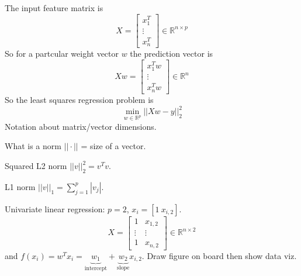 \documentclass{article}
\begin{document}
The input feature matrix is 
\begin{equation}
  X = \left[\begin{array}{c}
              x_1^T \\
              \vdots \\
              x_n^T
\end{array}\right]\in\mathbb R^{n\times p}
\end{equation}
So for a partcular weight vector $w$ the prediction vector is
\begin{equation}
  Xw = \left[\begin{array}{c}
              x_1^T w \\
              \vdots \\
              x_n^T w
\end{array}\right]\in\mathbb R^{n}
\end{equation}
So the least squares regression problem is
\begin{equation}
  \min_{w\in\mathbb R^p} || Xw - y||_2^2
\end{equation}
Notation about matrix/vector dimensions.

What is a norm $||\cdot||$ = size of a vector.

Squared L2 norm $||v||_2^2 = v^T v$.

L1 norm $||v||_1 = \sum_{j=1}^p |v_j|$.

Univariate linear regression: $p=2$, $x_i=[1\ x_{i,2}]$.
\begin{equation}
  X = \left[\begin{array}{cc}
              1 & x_{1,2} \\
              \vdots & \vdots \\
              1 & x_{n,2}
\end{array}\right]\in\mathbb R^{n\times 2}
\end{equation}
and
$f(x_i) = w^T x_i = \underbrace{w_1}_{\text{intercept}} +
\underbrace{w_2}_{\text{slope}} x_{i,2}$. Draw figure on board then
show data viz.
\end{document}
